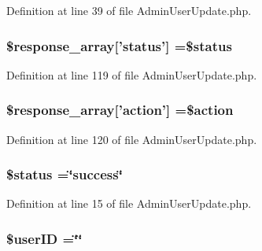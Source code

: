 Definition at line 39 of file Admin\-User\-Update.\-php.

\hypertarget{_admin_user_update_8php_acd0903a7a32e8397aefd0ce8b7dbd1ab}{
\subsubsection[{\$response\-\_\-array}]{\setlength{\rightskip}{0pt plus 5cm}\$response\-\_\-array\mbox{[}'status'\mbox{]} =\$status}}\label{_admin_user_update_8php_acd0903a7a32e8397aefd0ce8b7dbd1ab}


Definition at line 119 of file Admin\-User\-Update.\-php.

\hypertarget{_admin_user_update_8php_ae768978a0cdc416c0d63d798c85c8784}{
\subsubsection[{\$response\-\_\-array}]{\setlength{\rightskip}{0pt plus 5cm}\$response\-\_\-array\mbox{[}'action'\mbox{]} =\$action}}\label{_admin_user_update_8php_ae768978a0cdc416c0d63d798c85c8784}


Definition at line 120 of file Admin\-User\-Update.\-php.

\hypertarget{_admin_user_update_8php_a58391ea75f2d29d5d708d7050b641c33}{
\subsubsection[{\$status}]{\setlength{\rightskip}{0pt plus 5cm}\$status =\char`\"{}success\char`\"{}}}\label{_admin_user_update_8php_a58391ea75f2d29d5d708d7050b641c33}


Definition at line 15 of file Admin\-User\-Update.\-php.

\hypertarget{_admin_user_update_8php_aea70bbe59be6896e9cbbb9811a864ee8}{
\subsubsection[{\$user\-I\-D}]{\setlength{\rightskip}{0pt plus 5cm}\$user\-I\-D =\char`\"{}\char`\"{}}}\label{_admin_user_update_8php_aea70bbe59be6896e9cbbb9811a864ee8}


